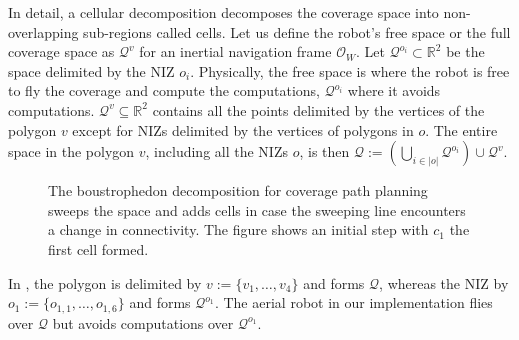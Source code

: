 In detail, a cellular decomposition decomposes the coverage space into non-overlapping sub-regions called cells. Let us define the robot's free space or the full coverage space as $\mathcal{Q}^v$ for an inertial navigation frame $\mathcal{O}_W$. Let $\mathcal{Q}^{o_i}\subset\mathbb{R}^2$ be the space delimited by the NIZ $o_i$. Physically, the free space is where the robot is free to fly the coverage and compute the computations, $\mathcal{Q}^{o_i}$ where it avoids computations. $\mathcal{Q}^v\subseteq\mathbb{R}^2$ contains all the points delimited by the vertices of the polygon $v$ except for NIZs delimited by the vertices of polygons in $o$. The entire space in the polygon $v$, including all the NIZs $o$, is then $\mathcal{Q}:=(\bigcup_{i\in|o|}\mathcal{Q}^{o_i})\cup\mathcal{Q}^v$. 
\begin{figure}[h]
  \centering
  \selectfont
  
  \caption[Initial step of the boustrophedon decomposition]{The boustrophedon decomposition for coverage path planning sweeps the space and adds cells in case the sweeping line encounters a change in connectivity. The figure shows an initial step with $c_1$ the first cell formed.}
  \label{fig:bcd2}
\end{figure}
In , the polygon is delimited by $v:=\{v_1,\dots,v_4\}$ and forms $\mathcal{Q}$, whereas the NIZ by $o_1:=\{o_{1,1},\dots,o_{1,6}\}$ and forms $\mathcal{Q}^{o_1}$. The aerial robot in our implementation flies over $\mathcal{Q}$ but avoids computations over $\mathcal{Q}^{o_1}$.

